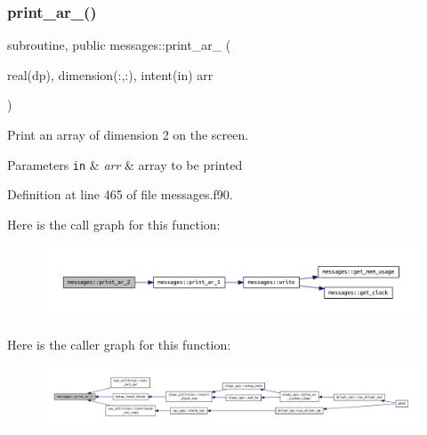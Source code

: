 \subsubsection{\texorpdfstring{print\+\_\+ar\+\_()}{print\_ar\_2()}}
{\footnotesize\ttfamily subroutine, public messages\+::print\+\_\+ar\+\_ (\begin{DoxyParamCaption}\item[{real(dp), dimension(\+:,\+:), intent(in)}]{arr }\end{DoxyParamCaption})}



Print an array of dimension 2 on the screen. 


\begin{DoxyParams}[1]{Parameters}
\mbox{\tt in}  & {\em arr} & array to be printed \\
\hline
\end{DoxyParams}


Definition at line 465 of file messages.\+f90.

Here is the call graph for this function\+:
\nopagebreak
\begin{figure}[H]
\begin{center}
\leavevmode
\includegraphics[width=350pt]{namespacemessages_a80797cedef6112b8dccaeda431f0c610_cgraph}
\end{center}
\end{figure}
Here is the caller graph for this function\+:
\nopagebreak
\begin{figure}[H]
\begin{center}
\leavevmode
\includegraphics[width=350pt]{namespacemessages_a80797cedef6112b8dccaeda431f0c610_icgraph}
\end{center}
\end{figure}
\mbox{\label{namespacemessages_a0da9248828de8b7480b99b47618e8310}} 
